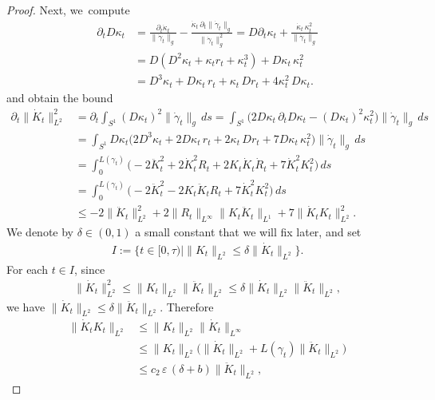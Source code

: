 \documentclass[11pt]{article}
\let\sep\mid
\let\epsilon\varepsilon
\theoremstyle{plain}
\theoremstyle{definition}
\begin{document}
\begin{proof}
Next, we~compute
\begin{align*}
\partial_t D\kappa_t
&=
\frac{\partial_t \dot \kappa_t}{\|\dot\gamma_t\|_g}
-
\frac{\dot \kappa_t\,\partial_t\|\dot\gamma_t\|_g}{\|\dot\gamma_t\|_g^2}
=
D\partial_t \kappa_t + \frac{\dot \kappa_t\,\kappa_t^2}{\|\dot\gamma_t\|_g}\\
&=
D(D^2 \kappa_t + \kappa_t r_t + \kappa_t^3) + D\kappa_t\,\kappa_t^2\\
&=
D^3 \kappa_t + D\kappa_t\, r_t + \kappa_t\,Dr_t + 4\kappa_t^2\,D\kappa_t .
\end{align*}
and obtain the bound
\begin{align*}
\partial_t \|\dot K_t\|_{L^2}^2
&=
\partial_t \int_{S^1} (D\kappa_t)^2\|\dot\gamma_t\|_g\,ds
=
\int_{S^1} \big(2 D\kappa_t\,\partial_tD\kappa_t - (D\kappa_t)^2\kappa_t^2 \big)\|\dot\gamma_t\|_g\,ds\\
&=
\int_{S^1} D\kappa_t\big(2 D^3\kappa_t + 2D\kappa_t\,r_t + 2\kappa_t\,Dr_t + 7D\kappa_t\,\kappa_t^2 \big)\|\dot\gamma_t\|_g\,ds\\
&=
\int_0^{L(\gamma_t)} \Big(\! -2 \ddot K_t^2 + 2\dot K_t^2 R_t + 2K_t \dot K_t \dot R_t + 7\dot K_t^2 K_t^2 \Big)\,ds\\
&=
\int_0^{L(\gamma_t)} \Big(\! -2 \ddot K_t^2 - 2 K_t \ddot K_t R_t + 7\dot K_t^2 K_t^2 \Big)\,ds\\
&\leq -2 \|\ddot K_t\|_{L^2}^2 + 2 \|R_t\|_{L^\infty} \|K_t \ddot K_t\|_{L^1} + 7 \|\dot K_t K_t\|_{L^2}^2.
\end{align*}
We denote by $\delta\in(0,1)$ a small constant that we will fix later, and set
\begin{align*}
I:=\big\{ t\in[0,\tau)\sep \|K_t\|_{L^2} \leq \delta \|\dot K_t\|_{L^2} \big\}.
\end{align*}
For each $t\in I$, since
\begin{align*}
\|\dot K_t\|_{L^2}^2
\leq
\|K_t\|_{L^2}\|\ddot K_t\|_{L^2}
\leq
\delta\|\dot K_t\|_{L^2}\|\ddot K_t\|_{L^2},
\end{align*}
we have $\|\dot K_t\|_{L^2}\leq \delta\|\ddot K_t\|_{L^2}$. Therefore
\begin{equation}
\label{e:Cinfty_Zoll_estimates_2_1}
\begin{split}
\|\dot K_t K_t\|_{L^2}
&\leq
\|K_t\|_{L^2} \|\dot K_t\|_{L^\infty}\\
&\leq
\|K_t\|_{L^2} \big(\|\dot K_t\|_{L^2} + L(\gamma_t)\|\ddot K_t\|_{L^2}\big)\\
&\leq
c_2\,\epsilon\,(\delta+b)\|\ddot K_t\|_{L^2},
\end{split}

\end{equation}
\end{proof}
\end{document}
